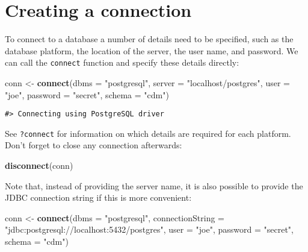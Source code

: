 \documentclass[]{article}
\newenvironment{Shaded}{\begin{snugshade}}{\end{snugshade}}
\newcommand{\DataTypeTok}[1]{\textcolor[rgb]{0.13,0.29,0.53}{#1}}
\newcommand{\KeywordTok}[1]{\textcolor[rgb]{0.13,0.29,0.53}{\textbf{#1}}}
\newcommand{\NormalTok}[1]{#1}
\newcommand{\StringTok}[1]{\textcolor[rgb]{0.31,0.60,0.02}{#1}}
\begin{document}
\hypertarget{creating-a-connection}{%
\section{Creating a connection}\label{creating-a-connection}}

To connect to a database a number of details need to be specified, such
as the database platform, the location of the server, the user name, and
password. We can call the \texttt{connect} function and specify these
details directly:

\begin{Shaded}
\begin{Highlighting}[]
\NormalTok{conn <-}\StringTok{ }\KeywordTok{connect}\NormalTok{(}\DataTypeTok{dbms =} \StringTok{"postgresql"}\NormalTok{,}
                \DataTypeTok{server =} \StringTok{"localhost/postgres"}\NormalTok{,}
                \DataTypeTok{user =} \StringTok{"joe"}\NormalTok{,}
                \DataTypeTok{password =} \StringTok{"secret"}\NormalTok{,}
                \DataTypeTok{schema =} \StringTok{"cdm"}\NormalTok{)}
\end{Highlighting}
\end{Shaded}

\begin{verbatim}
#> Connecting using PostgreSQL driver
\end{verbatim}

See \texttt{?connect} for information on which details are required for
each platform. Don't forget to close any connection afterwards:

\begin{Shaded}
\begin{Highlighting}[]
\KeywordTok{disconnect}\NormalTok{(conn)}
\end{Highlighting}
\end{Shaded}

Note that, instead of providing the server name, it is also possible to
provide the JDBC connection string if this is more convenient:

\begin{Shaded}
\begin{Highlighting}[]
\NormalTok{conn <-}\StringTok{ }\KeywordTok{connect}\NormalTok{(}\DataTypeTok{dbms =} \StringTok{"postgresql"}\NormalTok{,}
                \DataTypeTok{connectionString =} \StringTok{"jdbc:postgresql://localhost:5432/postgres"}\NormalTok{,}
                \DataTypeTok{user =} \StringTok{"joe"}\NormalTok{,}
                \DataTypeTok{password =} \StringTok{"secret"}\NormalTok{,}
                \DataTypeTok{schema =} \StringTok{"cdm"}\NormalTok{)}
\end{Highlighting}
\end{Shaded}
\end{document}

